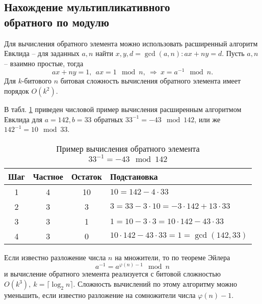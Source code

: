 \subsection[Нахождение мультипликативного обратного]{Нахождение мультипликативного \protect\\ обратного по модулю}

Для вычисления обратного элемента можно использовать расширенный алгоритм Евклида -- для заданных $a, n$ найти $x, y, d = \gcd(a,n): ax + ny = d$. Пусть $a,n$ -- взаимно простые, тогда
    \[ ax + ny = 1, ~~ ax = 1 \mod n, ~ \Rightarrow ~ x = a^{-1} \mod n. \]
Для $k$-битового $n$ битовая сложность вычисления обратного элемента имеет порядок $O(k^2)$.

\example
В табл. \ref{tab:extended-euclid-inverse} приведен числовой пример вычисления расширенным алгоритмом Евклида для $a=142, b=33$ обратных $33^{-1} = -43 \mod 142$, или же $142^{-1} = 10 \mod 33$.

\begin{table}[!ht]
    \centering
    \caption{Пример вычисления обратного элемента \\ $33^{-1}  = -43 \mod 142$\label{tab:extended-euclid-inverse}}
    \begin{tabular}{|c|c|c|l|}
        \hline
        Шаг & Частное & Остаток & Подстановка \\
        \hline
        1 & 4 & 10 & $10 = 142 - 4 \cdot 33$ \\
        2 & 3 & 3  & $3 = 33 - 3 \cdot 10 = -3 \cdot 142 + 13 \cdot 33$ \\
        3 & 3 & 1  & $1 = 10 - 3 \cdot 3 = 10 \cdot 142 - 43 \cdot 33$ \\
        4 & 3 & 0  & $10 \cdot 142 - 43 \cdot 33 = 1 = \gcd(142,33)$ \\
        \hline
    \end{tabular}
\end{table}
\exampleend

Если известно разложение числа $n$ на множители, то по теореме Эйлера
    \[ a^{-1} = a^{\varphi(n) - 1} \mod n \]
и вычисление обратного элемента реализуется с битовой сложностью $O(k^3),~ k = \lceil \log_2 n \rceil$. Сложность вычислений по этому алгоритму можно уменьшить, если известно разложение на сомножители числа $\varphi(n) - 1$.
